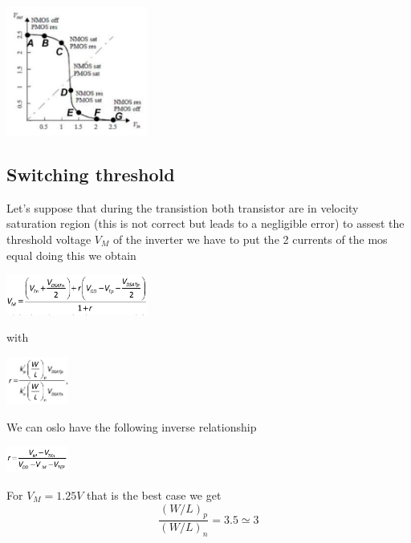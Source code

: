 \centering
\includegraphics[width=0.35\textwidth]{C3_2.png}\\
\raggedright



\subsection{Switching threshold}
Let's suppose that during the transistion both transistor are in velocity saturation region (this is not correct but leads to a negligible error) to assest the threshold voltage $V_M$ of the inverter we have to put the 2 currents of the mos equal doing this we obtain 

\vspace{2.5mm}

\centering
\includegraphics[width=0.35\textwidth]{C3_3.png}\\
\raggedright
 
with 

\centering
\includegraphics[width=0.15\textwidth]{C3_4.png}\\
\raggedright

We can oslo have the following inverse relationship

\vspace{2.5mm}

\centering
\includegraphics[width=0.15\textwidth]{C3_5.png}\\
\raggedright

For $V_M=1.25V$ that is the best case we get
\begin{equation}
\frac{(W/L)_p}{(W/L)_n}=3.5\simeq 3
\end{equation}

